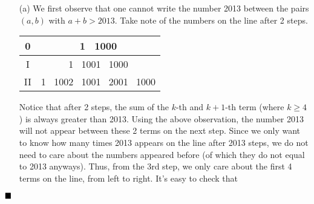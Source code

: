 \documentclass[11pt]{article}
\newenvironment{solution}[1][Solution]{%
  \proof[\normalfont \faPenNib \hspace{0.2cm} \ttfamily \scshape \large #1]%
}{\(\hfill \blacksquare\){\parfillskip0pt\par}}
\theoremstyle{definition}
\newcommand{\boom}{\vspace{0.25cm}}
\begin{document}
        \begin{solution}
            \hfill
            \begin{enumerate}
                \item[(a)] We first observe that one cannot write the number 2013 between the pairs \((a,b)\) with \(a + b > 2013\). Take note of the numbers on the line after 2 steps.
                
                \boom
                
                \begin{center}
                    \begin{tabular}{ |c|c| } 
                        \hline
                        0 & 1 \ 1000 \\
                        \hline
                        I & 1 \ 1001 \ 1000 \\ 
                        \hline
                        II & 1 \ 1002 \ 1001 \ 2001 \ 1000 \\ 
                        \hline
                    \end{tabular}
                \end{center}
                
                \boom
                
                Notice that after 2 steps, the sum of the \(k\)-th and \(k + 1\)-th term (where \(k \geq 4\)) is always greater than 2013. Using the above observation, the number 2013 will not appear between these 2 terms on the next step. Since we only want to know how many times 2013 appears on the line after 2013 steps, we do not need to care about the numbers appeared before (of which they do not equal to 2013 anyways). Thus, from the 3rd step, we only care about the first 4 terms on the line, from left to right. It's easy to check that
                
                \boom
                

\end{enumerate}
\end{solution}
\end{document}
